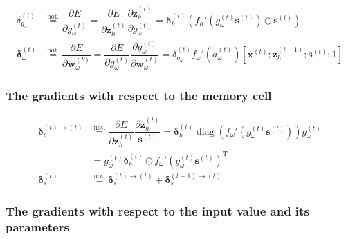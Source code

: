 \documentclass[11pt]{article}
\DeclareMathOperator{\diag}{diag}
\begin{document}
\begin{align}
  \delta_{g_{\omega}}^{(t)} &\overset{\text{not.}}{=} \dfrac{\partial E}{\partial g_{\omega}^{(t)}} = \dfrac{\partial E}{\partial \mathbf{z}_{h}^{(t)}} \dfrac{\partial \mathbf{z}_h^{(t)}}{\partial g_{\omega}^{(t)}} = \boldsymbol{\delta}_h^{(t)}\left(f_h'\left(g_{\omega}^{(t)}\mathbf{s}^{(t)}\right)\odot\mathbf{s}^{(t)}\right) \\
  \boldsymbol{\delta}_{\omega}^{(t)} &\overset{\text{not.}}{=} \dfrac{\partial E}{\partial \boldsymbol{w}_{\omega}^{(t)}} = \dfrac{\partial E}{\partial g_{\omega}^{(t)}} \dfrac{\partial g_{\omega}^{(t)}}{\partial \boldsymbol{w}_{\omega}^{(t)}} = \delta_{g_{\omega}}^{(t)} f_{\omega}'\left(a_{\omega}^{(t)}\right) \left[\mathbf{x}^{(t)}; \mathbf{z}_{h}^{(t-1)}; \mathbf{s}^{(t)}; 1\right]
\end{align}

\subsubsection*{The gradients with respect to the memory cell}

\begin{align}
  \boldsymbol{\delta}_s^{(t)\rightarrow(t)}
  & \overset{\text{not.}}{=}
    \dfrac{\partial E}{\partial \boldsymbol{z}_h^{(t)}}
    \dfrac{\partial \boldsymbol{z}_h^{(t)}}{\boldsymbol{s}^{(t)}} =
    \boldsymbol{\delta}_{h}^{(t)} \diag\left(f_{\omega}'\left(g_{\omega}^{(t)}\boldsymbol{s}^{(t)}\right)\right) g_{\omega}^{(t)} \\
  & = g_{\omega}^{(t)}\boldsymbol{\delta}_h^{(t)} \odot f_{\omega}'\left(g_{\omega}^{(t)}\boldsymbol{s}^{(t)}\right)^{\text{T}} \\
  \boldsymbol{\delta}_s^{(t)} &\overset{\text{not.}}{=} \boldsymbol{\delta}^{(t) \rightarrow (t)}_s + \boldsymbol{\delta}^{(t+1) \rightarrow (t)}_s
\end{align}

\subsubsection*{The gradients with respect to the input value and its
  parameters}
\end{document}

